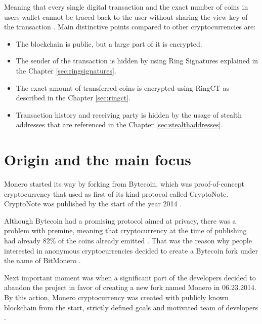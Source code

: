\documentclass[
  printed, %
  table,   %
  lof,     %
  lot,     %
           oneside, color
]{fithesis3}
\begin{document}
Meaning that every single digital transaction and the exact number of coins in users wallet cannot be traced back to the user without sharing the view key of the transaction \cite{moneroprojectgithub}. Main distinctive points compared to other cryptocurrencies are:

\begin{itemize}\itemsep0em
\item The blockchain is public, but a large part of it is encrypted.
\item The sender of the transaction is hidden by using Ring Signatures explained in the Chapter \ref{sec:ringsignatures}.
\item The exact amount of transferred coins is encrypted using RingCT as described in the Chapter \ref{sec:ringct}.
\item Transaction history and receiving party is hidden by the usage of stealth addresses that are referenced in the Chapter \ref{sec:stealthaddresses}.
\end{itemize}

\section{Origin and the main focus}
Monero started its way by forking from Bytecoin, which was proof-of-concept cryptocurrency that used as first of its kind protocol called CryptoNote. CryptoNote was published by the start of the year 2014 \cite{githubbytecoin}.

Although Bytecoin had a promising protocol aimed at privacy, there was a problem with premine, meaning that cryptocurrency at the time of publishing had already 82\% of the coins already emitted \cite{fluffyponyonbytecoin}. That was the reason why people interested in anonymous cryptocurrencies decided to create a Bytecoin fork under the name of BitMonero \cite{bitmonero}. 

Next important moment was when a significant part of the developers decided to abandon the project in favor of creating a new fork named Monero in 06.23.2014. By this action, Monero cryptocurrency was created with publicly known blockchain from the start, strictly defined goals and motivated team of developers \cite{monerofork}.

\end{document}
